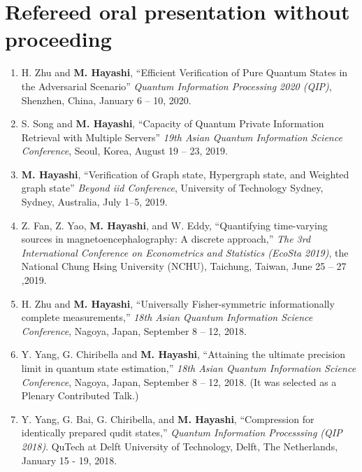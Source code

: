 \documentclass[a4paper,12pt,oneside]{article}
\begin{document}
\section{Refereed oral presentation without proceeding}
\begin{enumerate}

\item 
H. Zhu and \textbf{M. Hayashi}, 
``Efficient Verification of Pure Quantum States in the Adversarial Scenario''
{\em Quantum Information Processing 2020 (QIP)}, 
Shenzhen, China, January 6 -- 10, 2020.


\item 
S. Song and \textbf{M. Hayashi}, 
``Capacity of Quantum
Private Information Retrieval with Multiple Servers''
{\em 19th Asian Quantum Information Science Conference},
Seoul, Korea, August 19 -- 23, 2019.

\item 
\textbf{M. Hayashi}, 
``Verification of Graph state, Hypergraph state, and Weighted graph state''
{\em Beyond iid Conference},
University of Technology Sydney, Sydney, Australia, 
July 1--5, 2019.

\item 
Z. Fan, Z. Yao, \textbf{M. Hayashi}, and W. Eddy,
``Quantifying time-varying sources in magnetoencephalography: A discrete approach,''
{\em The 3rd International Conference on Econometrics and Statistics (EcoSta 2019)},
the National Chung Hsing University (NCHU), Taichung, Taiwan, June 25 -- 27 ,2019.

\item 
H. Zhu and \textbf{M. Hayashi},
``Universally Fisher-symmetric informationally complete measurements,''
{\em 18th Asian Quantum Information Science Conference},
Nagoya, Japan, September 8 -- 12, 2018.

\item 
Y. Yang, G. Chiribella and \textbf{M. Hayashi},
``Attaining the ultimate precision limit in quantum state estimation,''
{\em 18th Asian Quantum Information Science Conference},
Nagoya, Japan, September 8 -- 12, 2018.
(It was selected as a Plenary Contributed Talk.)

\item 
Y. Yang, G. Bai, G. Chiribella, and \textbf{M. Hayashi}, 
``Compression for identically prepared qudit states,'' 
{\em Quantum Information Processsing (QIP 2018)}.
QuTech at Delft University of Technology, Delft, The Netherlands,
January 15 - 19, 2018.


\end{enumerate}
\end{document}
